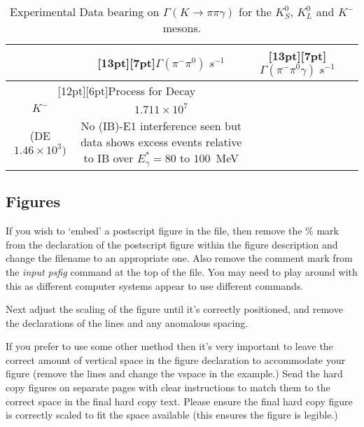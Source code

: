 \begin{table}[t]
\caption{Experimental Data bearing on 
$\Gamma(K \rightarrow \pi \pi \gamma)$
for the $K^0_S$, $K^0_L$ and $K^-$ mesons.\label{tab:exp}}
\vspace{0.2cm}
\begin{center}
\footnotesize
\begin{tabular}{|c|c|c|l|}
\hline
{} &\raisebox{0pt}[13pt][7pt]{$\Gamma(\pi^- \pi^0)\; s^{-1}$} &
\raisebox{0pt}[13pt][7pt]{$\Gamma(\pi^-\pi^0\gamma)\; s^{-1}$} &{}\\
\hline
\multicolumn{2}{|c|}{\raisebox{0pt}[12pt][6pt]{Process 
for Decay}} & &\\
\cline{1-2}
$K^-$   &$1.711 \times 10^7$ 
&\begin{minipage}{1in}
\begin{center}
$2.22 \times 10^4$ \\ (DE $ 1.46 \times 10^3)$
\end{center}
\end{minipage} 
&\begin{minipage}{1.5in}
\phantom{xxx}
No (IB)-E1 interference seen but data shows excess events 
relative to IB over
$E^{\ast}_{\gamma} = 80$ to $100$~MeV
\end{minipage} \\[22pt]
\hline
\end{tabular}
\end{center}
\end{table}

\subsection{Figures}
If you wish to `embed' a postscript figure in the file,
then remove the \% mark from the declaration of the
postscript figure within the figure description and
change the filename to an appropriate one. Also remove
the comment mark from the {\em input psfig} command at
the top of the file. You may need to play around with
this as different computer systems appear to use
different commands.

Next adjust the scaling of the figure until it's
correctly positioned, and remove the declarations of the
lines and any anomalous spacing. 

If you prefer to use some other method then it's very 
important to leave the correct amount of vertical space in 
the figure declaration to accommodate your figure 
(remove the lines and change the vspace in the example.) 
Send the hard copy figures on separate pages with clear
instructions to match them to the correct space in the 
final hard copy text. Please ensure the final hard copy 
figure is correctly scaled to fit the space available (this 
ensures the figure is legible.)

